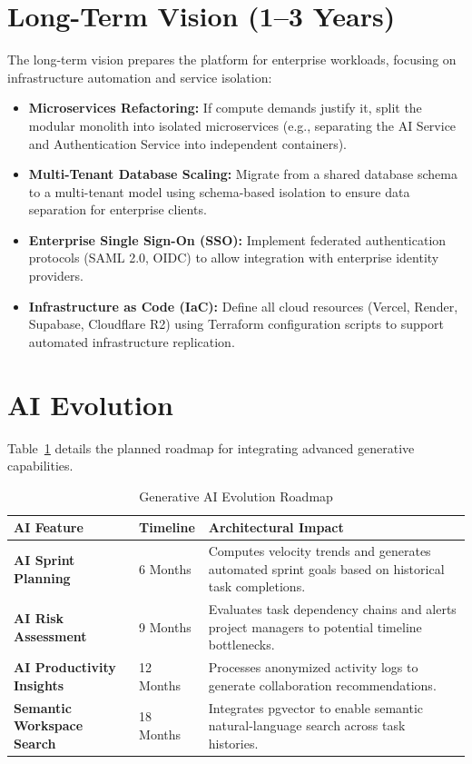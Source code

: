 \section{Long-Term Vision (1--3 Years)}
The long-term vision prepares the platform for enterprise workloads, focusing on infrastructure automation and service isolation:
\begin{itemize}
    \item \textbf{Microservices Refactoring:} If compute demands justify it, split the modular monolith into isolated microservices (e.g., separating the AI Service and Authentication Service into independent containers).
    \item \textbf{Multi-Tenant Database Scaling:} Migrate from a shared database schema to a multi-tenant model using schema-based isolation to ensure data separation for enterprise clients.
    \item \textbf{Enterprise Single Sign-On (SSO):} Implement federated authentication protocols (SAML 2.0, OIDC) to allow integration with enterprise identity providers.
    \item \textbf{Infrastructure as Code (IaC):} Define all cloud resources (Vercel, Render, Supabase, Cloudflare R2) using Terraform configuration scripts to support automated infrastructure replication.
\end{itemize}

\section{AI Evolution}
Table~\ref{tab:ai_evolution} details the planned roadmap for integrating advanced generative capabilities.

\begin{table}[h!]
\centering
\small
\renewcommand{\arraystretch}{1.4}
\begin{tabularx}{\textwidth}{l l X}
    \toprule[1.5pt]
    \rowcolor{primary!5}
    \textbf{\color{primary}AI Feature} & \textbf{\color{primary}Timeline} & \textbf{\color{primary}Architectural Impact} \\
    \midrule
    \textbf{AI Sprint Planning} & 6 Months & Computes velocity trends and generates automated sprint goals based on historical task completions. \\
    \textbf{AI Risk Assessment} & 9 Months & Evaluates task dependency chains and alerts project managers to potential timeline bottlenecks. \\
    \textbf{AI Productivity Insights} & 12 Months & Processes anonymized activity logs to generate collaboration recommendations. \\
    \textbf{Semantic Workspace Search} & 18 Months & Integrates pgvector to enable semantic natural-language search across task histories. \\
    \bottomrule[1.5pt]
\end{tabularx}
\caption{Generative AI Evolution Roadmap}
\label{tab:ai_evolution}
\end{table}

